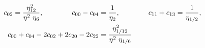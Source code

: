 \begin{equation}
  \begin{split}
    c_{02} = {\eta_{12}^2 \over \eta^2 ~\eta_{6}}, \qquad \qquad
  c_{00} -c_{04} &= {1 \over \eta_{2}}, \qquad \qquad 
  c_{11} +c_{13} = {1 \over \eta_{1/2}}, \\
  c_{00} +c_{04} -2c_{02} + 2c_{20} -2c_{22} &= {\eta_{1/12}^2 \over
    \eta^2 ~\eta_{1/6}}
  \end{split}
\end{equation}


